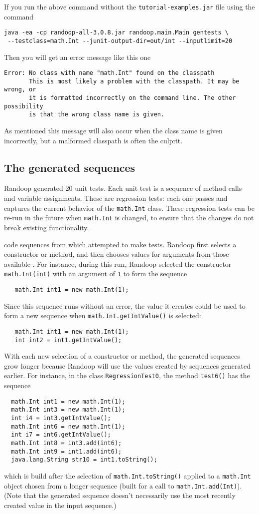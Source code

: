 \documentclass[11pt, oneside]{article} %
\newcommand{\code}[1]{{\texttt{#1}}}
\newcommand{\cmd}[1]{{\texttt{#1}}}
\begin{document}
If you run the above command without the \texttt{tutorial-examples.jar} file using the command
\begin{verbatim}
java -ea -cp randoop-all-3.0.8.jar randoop.main.Main gentests \
 --testclass=math.Int --junit-output-dir=out/int --inputlimit=20
\end{verbatim}
Then you will get an error message like this one
\begin{verbatim}
Error: No class with name "math.Int" found on the classpath
       This is most likely a problem with the classpath. It may be wrong, or
       it is formatted incorrectly on the command line. The other possibility
       is that the wrong class name is given.
\end{verbatim}
As mentioned this message will also occur when the class name is given incorrectly, but a malformed classpath is often the culprit.


\subsection{The generated sequences}
Randoop generated 20 unit tests.  Each unit test is a sequence of method
calls and variable assignments.  These are regression tests:  each one
passes and captures the current behavior of the \code{math.Int} class.
These regression tests can be re-run in the future when \code{math.Int} is
changed, to ensure that the changes do not break existing functionality.

 code sequences from which attempted to make tests. 
Randoop first selects a constructor or method, and then chooses values for arguments from those available .
For instance, during this run, Randoop selected the constructor \code{math.Int(int)} with an argument of \code{1} to form the sequence
\begin{verbatim}
   math.Int int1 = new math.Int(1);
\end{verbatim}
Since this sequence runs without an error, the value it creates could be used to form a new sequence when \code{math.Int.getIntValue()} is selected:
\begin{verbatim}
   math.Int int1 = new math.Int(1);
   int int2 = int1.getIntValue();
\end{verbatim}
With each new selection of a constructor or method, the generated sequences grow longer because Randoop will use the values created by sequences generated earlier. 
For instance, in the class \code{RegressionTest0}, the method \cmd{test6()} has the sequence
\begin{verbatim}
  math.Int int1 = new math.Int(1);
  math.Int int3 = new math.Int(1);
  int i4 = int3.getIntValue();
  math.Int int6 = new math.Int(1);
  int i7 = int6.getIntValue();
  math.Int int8 = int3.add(int6);
  math.Int int9 = int1.add(int6);
  java.lang.String str10 = int1.toString();
\end{verbatim}
which is build after the selection of \code{math.Int.toString()} applied to a \code{math.Int} object chosen from a longer sequence (built for a call to \code{math.Int.add(Int)}).
(Note that the generated sequence doesn't necessarily use the most recently created value in the input sequence.)
\end{document}
